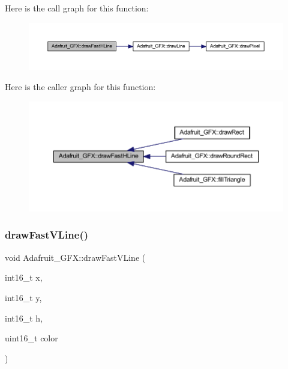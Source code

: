 Here is the call graph for this function\+:
\nopagebreak
\begin{figure}[H]
\begin{center}
\leavevmode
\includegraphics[width=350pt]{d9/d97/class_adafruit___g_f_x_a4d42e7cc577c1eb5b06fe656786c9c79_cgraph}
\end{center}
\end{figure}
Here is the caller graph for this function\+:
\nopagebreak
\begin{figure}[H]
\begin{center}
\leavevmode
\includegraphics[width=350pt]{d9/d97/class_adafruit___g_f_x_a4d42e7cc577c1eb5b06fe656786c9c79_icgraph}
\end{center}
\end{figure}
\mbox{\label{class_adafruit___g_f_x_a1cffbb1d69c5faf49cd0cff27686a837}} 
\subsubsection{\texorpdfstring{draw\+Fast\+V\+Line()}{drawFastVLine()}}
{\footnotesize\ttfamily void Adafruit\+\_\+\+G\+F\+X\+::draw\+Fast\+V\+Line (\begin{DoxyParamCaption}\item[{int16\+\_\+t}]{x,  }\item[{int16\+\_\+t}]{y,  }\item[{int16\+\_\+t}]{h,  }\item[{uint16\+\_\+t}]{color }\end{DoxyParamCaption})}

